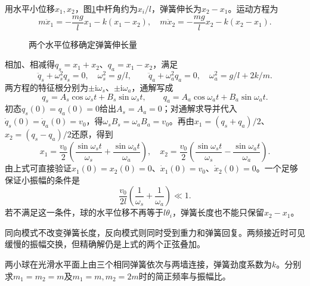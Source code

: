 \begin{solution}
用水平小位移$x_1,x_2$，图\ref{fig:hw4-3-s}中杆角约为$x_i/l$，弹簧伸长为$x_2-x_1$。运动方程为
\[
 m\ddot x_1=-\frac{mg}{l}x_1-k(x_1-x_2),\quad
 m\ddot x_2=-\frac{mg}{l}x_2-k(x_2-x_1).
\]

\begin{figure}[H]\centering
{}
\caption{两个水平位移确定弹簧伸长量}\label{fig:hw4-3-s}
\end{figure}

相加、相减得$q_s=x_1+x_2$、$q_a=x_1-x_2$，满足
\[
 \ddot q_s+\omega_s^2q_s=0,\quad\omega_s^2=g/l,
 \qquad\ddot q_a+\omega_a^2q_a=0,\quad\omega_a^2=g/l+2k/m.
\]
两方程的特征根分别为$\pm\mathrm i\omega_s$、$\pm\mathrm i\omega_a$，通解写成
\[
q_s=A_s\cos\omega_st+B_s\sin\omega_st,\qquad
q_a=A_a\cos\omega_at+B_a\sin\omega_at.
\]
初态$q_s(0)=q_a(0)=0$给出$A_s=A_a=0$；对通解求导并代入$\dot q_s(0)=\dot q_a(0)=v_0$，得$\omega_sB_s=\omega_aB_a=v_0$。再由$x_1=(q_s+q_a)/2$、$x_2=(q_s-q_a)/2$还原，得到
\[
 \boxed{x_1=\frac{v_0}{2}\left(\frac{\sin\omega_st}{\omega_s}
 +\frac{\sin\omega_at}{\omega_a}\right),\quad
 x_2=\frac{v_0}{2}\left(\frac{\sin\omega_st}{\omega_s}
 -\frac{\sin\omega_at}{\omega_a}\right)}.
\]
由上式可直接验证$x_1(0)=x_2(0)=0$、$\dot x_1(0)=v_0$、$\dot x_2(0)=0$。一个足够保证小振幅的条件是
\[
 \frac{v_0}{2l}\left(\frac1{\omega_s}+\frac1{\omega_a}\right)\ll1.
\]
若不满足这一条件，球的水平位移不再等于$l\theta_i$，弹簧长度也不能只保留$x_2-x_1$。

同向模式不改变弹簧长度，反向模式则同时受到重力和弹簧回复。两频接近时可见缓慢的振幅交换，但精确解仍是上式的两个正弦叠加。


\end{solution}



\begin{example}[三弹簧与不等质量双振子]\label{ex:hw4-5}

两小球在光滑水平面上由三个相同弹簧依次与两墙连接，弹簧劲度系数为$k$。分别求$m_1=m_2=m$及$m_1=m,m_2=2m$时的简正频率与振幅比。

\end{example}


